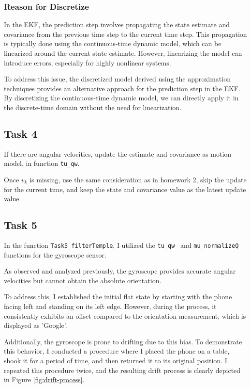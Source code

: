 \subsubsection{Reason for Discretize}

In the EKF, the prediction step involves propagating the state estimate and covariance from the previous time step to the current time step. This propagation is typically done using the continuous-time dynamic model, which can be linearized around the current state estimate. However, linearizing the model can introduce errors, especially for highly nonlinear systems.

To address this issue, the discretized model derived using the approximation techniques provides an alternative approach for the prediction step in the EKF. By discretizing the continuous-time dynamic model, we can directly apply it in the discrete-time domain without the need for linearization.

\subsection{Task 4}

If there are angular velocities, update the estimate and covariance as motion model, in function \texttt{tu\_qw}.

Once $ v_k $ is missing, use the same consideration as in homework 2, skip the update for the current time, and keep the state and covariance value as the latest update value.

\subsection{Task 5}

In the function \texttt{Task5\_filterTemple}, I utilized the \texttt{tu\_qw } and \texttt{mu\_normalizeQ} functions for the gyroscope sensor.

As observed and analyzed previously, the gyroscope provides accurate angular velocities but cannot obtain the absolute orientation.

To address this, I established the initial flat state by starting with the phone facing left and standing on its left edge. However, during the process, it consistently exhibits an offset compared to the orientation measurement, which is displayed as 'Google'.

Additionally, the gyroscope is prone to drifting due to this bias. To demonstrate this behavior, I conducted a procedure where I placed the phone on a table, shook it for a period of time, and then returned it to its original position. I repeated this procedure twice, and the resulting drift process is clearly depicted in Figure \ref{fig:drift-process}.

